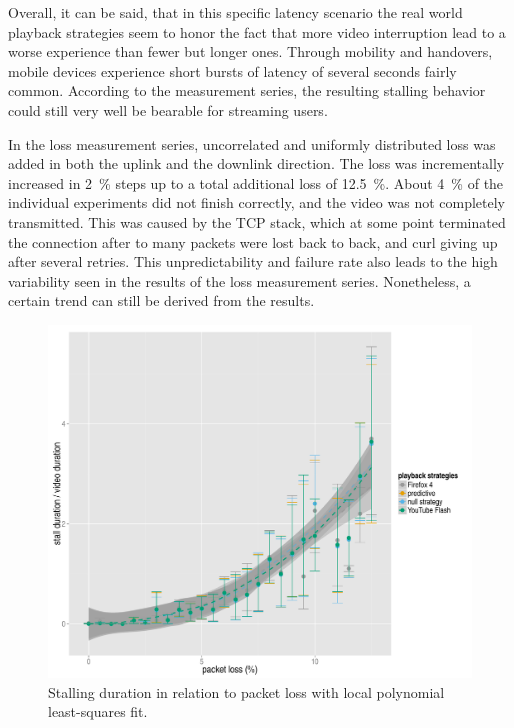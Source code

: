 Overall, it can be said, that in this specific latency scenario the real world playback strategies seem to honor the fact that more video interruption lead to a worse experience than fewer but longer ones.  Through mobility and handovers, mobile devices experience short bursts of latency of several seconds fairly common. According to the measurement series, the resulting stalling behavior could still very well be bearable for streaming users.

In the loss measurement series, uncorrelated and uniformly distributed loss was added in both the uplink and the downlink direction. The loss was incrementally increased in \SI{2}{\percent} steps up to a total additional loss of \SI{12.5}{\percent}. About \SI{4}{\percent} of the individual experiments did not finish correctly, and the video was not completely transmitted. This was caused by the \gls{TCP} stack, which at some point terminated the connection after to many packets were lost back to back, and curl giving up after several retries. This unpredictability and failure rate also leads to the high variability seen in the results of the loss measurement series. Nonetheless, a certain trend can still be derived from the results.


\begin{figure}[htbp]
    \centering
    \includegraphics[width=1.0\textwidth]{images/R-playbackemulation-stallduration-loss.pdf}
    \caption{Stalling duration in relation to packet loss with local polynomial least-squares fit.}
    \label{c3:fig:eval-loss-stallingtime}
\end{figure}



